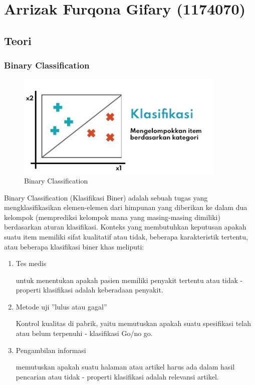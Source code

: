 \section{Arrizak Furqona Gifary (1174070)}
\subsection{Teori}

\subsubsection{Binary Classification}
\begin{figure}[H]
\centerline{\includegraphics[width=10cm]{figures/1174070/2/1.jpg}}
\caption{Binary Classification}
\label{labelgambar}
\end{figure}
Binary Classification (Klasifikasi Biner) adalah sebuah tugas yang mengklasifikasikan elemen-elemen dari himpunan yang diberikan ke dalam dua kelompok (memprediksi kelompok mana yang masing-masing dimiliki) berdasarkan aturan klasifikasi. Konteks yang membutuhkan keputusan apakah suatu item memiliki sifat kualitatif atau tidak, beberapa karakteristik tertentu, atau beberapa klasifikasi
biner khas meliputi:
\begin{enumerate}
\item Tes medis 

untuk menentukan apakah pasien memiliki penyakit tertentu atau tidak - properti klasifikasi adalah keberadaan penyakit.

\item Metode uji ”lulus atau gagal”

Kontrol kualitas di pabrik, yaitu memutuskan apakah suatu spesifikasi telah atau belum terpenuhi - klasifikasi Go/no go.

\item Pengambilan informasi

memutuskan apakah suatu halaman atau artikel harus ada dalam hasil pencarian atau tidak - properti klasifikasi adalah relevansi artikel.
\end{enumerate}

